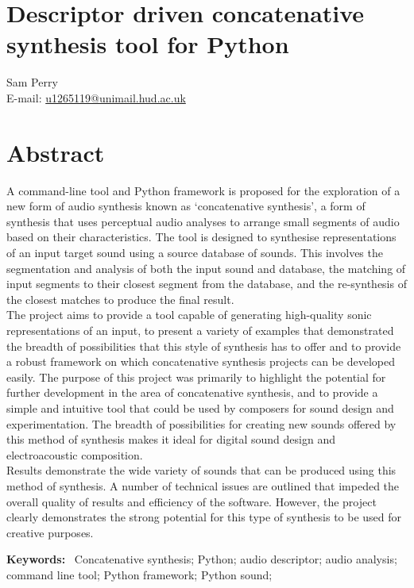 \documentclass{scrartcl}
\newenvironment{keywords}%
   {\begin{trivlist}\item[]{\bfseries\sffamily Keywords:}\ }%
   {\end{trivlist}}
\begin{document}
    \section*{Descriptor driven concatenative synthesis tool for Python}
    Sam Perry\\
    E-mail: \href{mailto:u1265119@unimail.hud.ac.uk}{u1265119@unimail.hud.ac.uk}
    \section*{Abstract} 
    A command-line tool and Python framework is proposed for the exploration of
    a new form of audio synthesis known as `concatenative synthesis', a form
    of synthesis that uses perceptual audio analyses to arrange small segments
    of audio based on their characteristics.  The tool is designed to
    synthesise representations of an input target sound using a source database
    of sounds. This involves the segmentation and analysis of both the input
    sound and database, the matching of input segments to their closest segment
    from the database, and the re-synthesis of the closest matches to produce
    the final result.\\
    The  project aims to provide a tool capable of generating high-quality
    sonic representations of an input, to present a variety of examples that
    demonstrated the breadth of possibilities that this style of synthesis has
    to offer and to provide a robust framework on which concatenative synthesis
    projects can be developed easily. The purpose of this project was primarily
    to highlight the potential for further development in the area of
    concatenative synthesis, and to provide a simple and intuitive tool that
    could be used by composers for sound design and experimentation. The
    breadth of possibilities for creating new sounds offered by this method of
    synthesis makes it ideal for digital sound design and electroacoustic
    composition.\\
    Results demonstrate the wide variety of sounds that can be produced using
    this method of synthesis. A number of technical issues are outlined that
    impeded the overall quality of results and efficiency of the software.
    However, the project clearly demonstrates the strong potential for this
    type of synthesis to be used for creative purposes.
    \begin{keywords}
        Concatenative synthesis; Python; audio descriptor; audio analysis; command line tool; Python framework; Python sound;
    \end{keywords}
\end{document}
